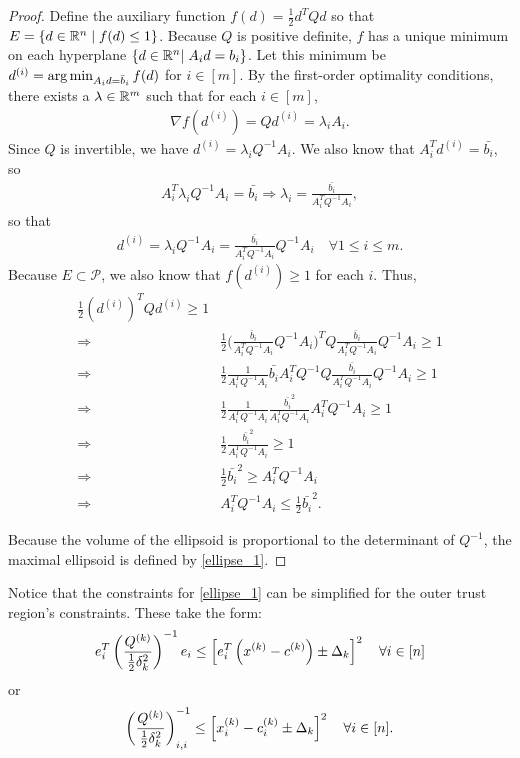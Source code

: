 \begin{proof}

Define the auxiliary function $f(d) = \frac 1 2 d^T Q d$ so that $E = \{ d \in \mathbb R^n\; | \; f(d) \le 1 \}$.
Because $Q$ is positive definite, $f$ has a unique minimum on each hyperplane $\left\{d \in \mathbb R^n | \; A_i d = b_i\right\}$.
Let this minimum be $d^{(i)} = \operatorname*{arg\,min}_{A_id =\bar{b}_i} f(d)$ for $i\in[m]$.
By the first-order optimality conditions, there exists a $\lambda \in \mathbb R^m$ such that for each $i\in[m]$,
\begin{align*}
\nabla f(d^{(i)}) = Q d^{(i)} = \lambda_i A_i.
\end{align*}
Since $Q$ is invertible, we have $d^{(i)} = \lambda_i Q^{-1}A_i$. 
We also know that $A_i^T d^{(i)} = \bar{b_i}$, so 
\begin{align*}
A_i^T \lambda_i Q^{-1}A_i = \bar{b_i} \Longrightarrow
\lambda_i = \frac {\bar{b_i}}{A_i^T  Q^{-1}A_i},
\end{align*}
so that
\begin{align*}
d^{(i)} = \lambda_i Q^{-1}A_i = \frac {\bar{b_i}}{A_i^T  Q^{-1}A_i}  Q^{-1}A_i \quad \forall 1\le i\le m.
\end{align*}
Because $E \subset \mathcal{P}$, we also know that $f(d^{(i)}) \ge 1$ for each $i$. Thus,
\begin{align*}
\frac 1 2 (d^{(i)})^{T} Q d^{(i)} \ge 1 \\
\Longrightarrow & \frac 1 2 \bigg(\frac {\bar{b}_i}{A_i^T  Q^{-1}A_i}  Q^{-1}A_i\bigg)^{T} Q \frac {\bar{b}_i}{A_i^T  Q^{-1}A_i}  Q^{-1}A_i \ge 1 \\
\Longrightarrow & \frac 1 2 \frac {1}{A_i^T  Q^{-1}A_i}  \bar{b_i} A_i^T Q^{-1} Q \frac {\bar{b_i}}{A_i^T  Q^{-1}A_i}  Q^{-1}A_i \ge 1 \\
\Longrightarrow & \frac 1 2 \frac {1}{A_i^T  Q^{-1}A_i}  \frac {\bar{b_i}^2}{A_i^T  Q^{-1}A_i}  A_i^T Q^{-1}A_i \ge 1 \\
\Longrightarrow & \frac 1 2  \frac {\bar{b_i}^2}{A_i^T  Q^{-1}A_i} \ge 1 \\
\Longrightarrow & \frac 1 2 \bar{b_i}^2\ge A_i^T  Q^{-1}A_i \\
\Longrightarrow & A_i^T  Q^{-1}A_i \le \frac 1 2 \bar{b_i}^2.
\end{align*}

Because the volume of the ellipsoid is proportional to the determinant of $Q^{-1}$, the maximal ellipsoid is defined by \cref{ellipse_1}.
\end{proof}


Notice that the constraints for \cref{ellipse_1} can be simplified for the outer trust region's constraints.
These take the form:
\begin{align*}
e_i^T\left(\frac{{Q^{(k)}}}{\frac 1 2 \delta_k^2}\right)^{-1} e_i \le \left[e_i^T\left(x^{(k)} - c^{(k)}\right) \pm \Delta_k \right]^2 \quad \forall i \in [n]
\end{align*}
or
\begin{align}
\label{ellipsoids_trust_region_constraints}
\left(\frac{{Q^{(k)}}}{\frac 1 2 \delta_k^2}\right)_{i,i}^{-1} \le \left[x_i^{(k)} - c^{(k)}_i \pm \Delta_k \right]^2 \quad \forall i \in [n].
\end{align}


